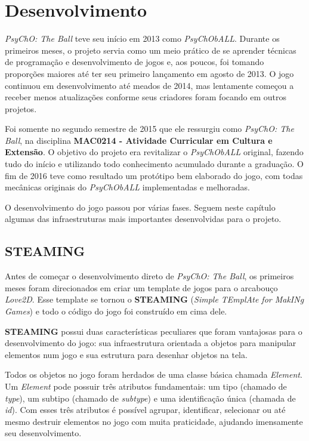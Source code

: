 \chapter{Desenvolvimento}
\label{cap:desenvolvimento}

\textit{PsyChO: The Ball} teve seu início em 2013 como \textit{PsyChObALL}. Durante os primeiros meses, o projeto servia como um meio prático de se aprender técnicas de programação e desenvolvimento de jogos e, aos poucos, foi tomando proporções maiores até ter seu primeiro lançamento em agosto de 2013. O jogo continuou em desenvolvimento até meados de 2014, mas lentamente começou a receber menos atualizações conforme seus criadores foram focando em outros projetos.

Foi somente no segundo semestre de 2015 que ele ressurgiu como \textit{PsyChO: The Ball}, na disciplina \textbf{MAC0214 - Atividade Curricular em Cultura e Extensão}. O objetivo do projeto era revitalizar o \textit{PsyChObALL} original, fazendo tudo do início e utilizando todo conhecimento acumulado durante a graduação. O fim de 2016 teve como resultado um protótipo bem elaborado do jogo, com todas mecânicas originais do \textit{PsyChObALL} implementadas e melhoradas.

O desenvolvimento do jogo passou por várias fases. Seguem neste capítulo algumas das infraestruturas mais importantes desenvolvidas para o projeto.

\section{STEAMING}
\label{sec:steaming}

Antes de começar o desenvolvimento direto de \textit{PsyChO: The Ball}, os primeiros meses foram direcionados em criar um template de jogos para o arcabouço \textit{Love2D}. Esse template se tornou o \textbf{STEAMING} (\textit{Simple TEmplAte for MakINg Games}) e todo o código do jogo foi construído em cima dele.

\textbf{STEAMING} possui duas características peculiares que foram vantajosas para o desenvolvimento do jogo: sua infraestrutura orientada a objetos para manipular elementos num jogo e sua estrutura para desenhar objetos na tela.

Todos os objetos no jogo foram herdados de uma classe básica chamada \textit{Element}. Um \textit{Element} pode possuir três atributos fundamentais: um tipo (chamado de \textit{type}), um subtipo (chamado de \textit{subtype}) e uma identificação única (chamada de \textit{id}). Com esses três atributos é possível agrupar, identificar, selecionar ou até mesmo destruir elementos no jogo com muita praticidade, ajudando imensamente seu desenvolvimento.

